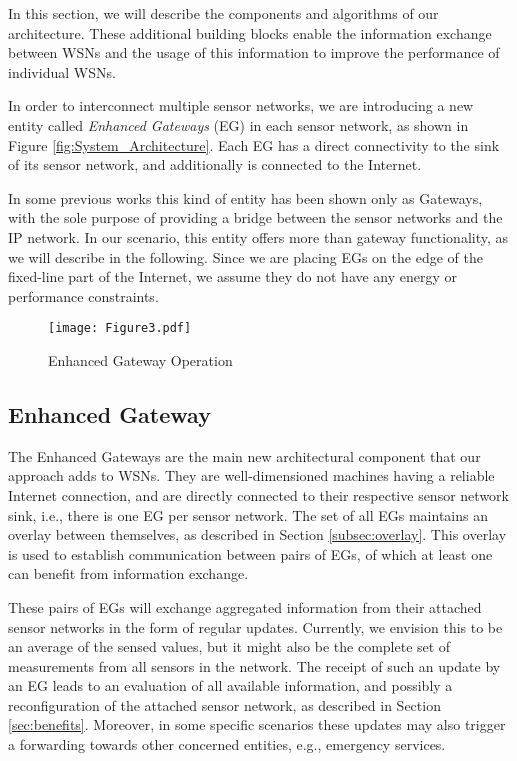 \documentclass[onecolumn]{jaise2e}
\begin{document}
In this section, we will describe the components and algorithms of our architecture. These additional building blocks enable the information exchange between WSNs and the usage of this information to improve the performance of individual WSNs.

In order to interconnect multiple sensor networks, we are introducing a new entity called \textit{Enhanced Gateways} (EG) in each sensor network, as shown in Figure \ref{fig:System_Architecture}. Each EG has a direct connectivity to the sink of its sensor network, and additionally is connected to the Internet.

In some previous works this kind of entity has been shown only as Gateways, with the sole purpose of providing a bridge between the sensor networks and the IP network. In our scenario, this entity offers more than gateway functionality, as we will describe in the following. Since we are placing EGs on the edge of the fixed-line part of the Internet, we assume they do not have any energy or performance constraints.

\begin{figure*}[t]
\centering
\texttt{[image: Figure3.pdf]} 
\caption{Enhanced Gateway Operation}
\label{fig:Flow Chart}
\end{figure*}


\subsection{Enhanced Gateway}\label{subsec:eg}

The Enhanced Gateways are the main new architectural component that our approach adds to WSNs. They are well-dimensioned machines having a reliable Internet connection, and are directly connected to their respective sensor network sink, i.e., there is one EG per sensor network. The set of all EGs maintains an overlay between themselves, as described in Section \ref{subsec:overlay}. This overlay is used to establish communication between pairs of EGs, of which at least one can benefit from information exchange.

These pairs of EGs will exchange aggregated information from their attached sensor networks in the form of regular updates. Currently, we envision this to be an average of the sensed values, but it might also be the complete set of measurements from all sensors in the network. The receipt of such an update by an EG leads to an evaluation of all available information, and possibly a reconfiguration of the attached sensor network, as described in Section \ref{sec:benefits}. Moreover, in some specific scenarios these updates may also trigger a forwarding towards other concerned entities, e.g., emergency services. 
\end{document}
